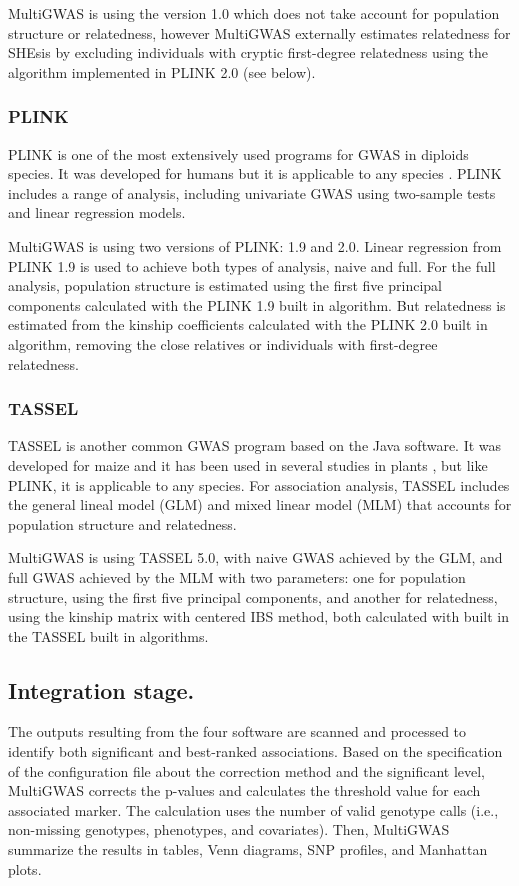 \documentclass{article}
\begin{document}
MultiGWAS is using the version 1.0 which does not take account for population structure or relatedness, however MultiGWAS externally estimates relatedness for SHEsis by excluding individuals with cryptic first-degree relatedness using the algorithm implemented in PLINK 2.0 (see below).


\subsubsection{PLINK}

PLINK is one of the most extensively used programs for GWAS in diploids species. It was developed for humans but it is applicable to any species \cite{Power2016}. PLINK includes a range of analysis, including univariate GWAS using two-sample tests and linear regression models.

MultiGWAS is using two versions of PLINK: 1.9 and 2.0. Linear regression from PLINK 1.9 is used to achieve both types of analysis, naive and full. For the full analysis, population structure is estimated using the first five principal components calculated with the PLINK 1.9 built in algorithm. But relatedness is estimated from the kinship coefficients calculated with the PLINK 2.0 built in algorithm, removing the close relatives or individuals with first-degree relatedness.

\subsubsection{TASSEL}

TASSEL is another common GWAS program based on the Java software. It was developed for maize and it has been used in several studies in plants \cite{Alvarez2017,Zhang2018}, but like PLINK, it is applicable to any species. For association analysis, TASSEL includes the general lineal model (GLM) and mixed linear model (MLM) that accounts for population structure and relatedness.

MultiGWAS is using TASSEL 5.0, with naive GWAS achieved by the GLM, and full GWAS achieved by the MLM with two parameters: one for population structure, using the first five principal components, and another for relatedness, using the kinship matrix with centered IBS method, both calculated with built in the TASSEL built in algorithms.


\subsection{Integration stage.} The outputs resulting from the four software are scanned and processed to identify both significant and best-ranked associations. Based on the specification of the configuration file about the correction method and the significant level, MultiGWAS corrects the p-values and calculates the threshold value for each associated marker. The calculation uses the number of valid genotype calls (i.e., non-missing genotypes, phenotypes, and covariates).  Then, MultiGWAS summarize the results in tables, Venn diagrams, SNP profiles, and  Manhattan plots.
\end{document}
